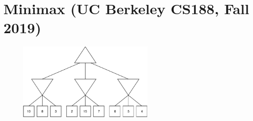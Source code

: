\documentclass[11pt, a4paper]{article}
\begin{document}
\newpage

\section{Minimax (UC Berkeley CS188, Fall 2019)}

\begin{figure}[h]
    \centering
    \includegraphics[width=0.6\textwidth]{figures/e2_minimax_0.pdf}
\end{figure}
\end{document}
